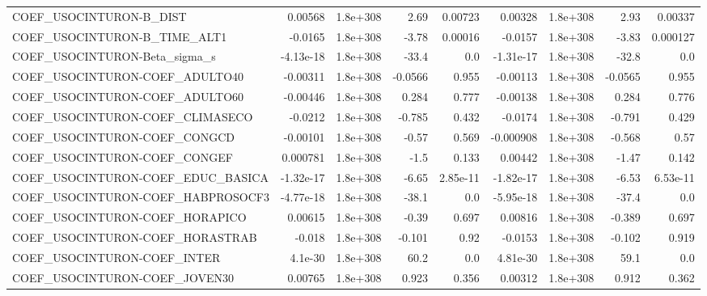 \begin{tabular}{lrrrrrrrr}
COEF\_USOCINTURON-B\_DIST           &     0.00568 &     1.8e+308 &      2.69 &  0.00723 &    0.00328 &    1.8e+308 &         2.93 &       0.00337 \\
COEF\_USOCINTURON-B\_TIME\_ALT1      &     -0.0165 &     1.8e+308 &     -3.78 &  0.00016 &    -0.0157 &    1.8e+308 &        -3.83 &      0.000127 \\
COEF\_USOCINTURON-Beta\_sigma\_s     &   -4.13e-18 &     1.8e+308 &     -33.4 &      0.0 &  -1.31e-17 &    1.8e+308 &        -32.8 &           0.0 \\
COEF\_USOCINTURON-COEF\_ADULTO40    &    -0.00311 &     1.8e+308 &   -0.0566 &    0.955 &   -0.00113 &    1.8e+308 &      -0.0565 &         0.955 \\
COEF\_USOCINTURON-COEF\_ADULTO60    &    -0.00446 &     1.8e+308 &     0.284 &    0.777 &   -0.00138 &    1.8e+308 &        0.284 &         0.776 \\
COEF\_USOCINTURON-COEF\_CLIMASECO   &     -0.0212 &     1.8e+308 &    -0.785 &    0.432 &    -0.0174 &    1.8e+308 &       -0.791 &         0.429 \\
COEF\_USOCINTURON-COEF\_CONGCD      &    -0.00101 &     1.8e+308 &     -0.57 &    0.569 &  -0.000908 &    1.8e+308 &       -0.568 &          0.57 \\
COEF\_USOCINTURON-COEF\_CONGEF      &    0.000781 &     1.8e+308 &      -1.5 &    0.133 &    0.00442 &    1.8e+308 &        -1.47 &         0.142 \\
COEF\_USOCINTURON-COEF\_EDUC\_BASICA &   -1.32e-17 &     1.8e+308 &     -6.65 & 2.85e-11 &  -1.82e-17 &    1.8e+308 &        -6.53 &      6.53e-11 \\
COEF\_USOCINTURON-COEF\_HABPROSOCF3 &   -4.77e-18 &     1.8e+308 &     -38.1 &      0.0 &  -5.95e-18 &    1.8e+308 &        -37.4 &           0.0 \\
COEF\_USOCINTURON-COEF\_HORAPICO    &     0.00615 &     1.8e+308 &     -0.39 &    0.697 &    0.00816 &    1.8e+308 &       -0.389 &         0.697 \\
COEF\_USOCINTURON-COEF\_HORASTRAB   &      -0.018 &     1.8e+308 &    -0.101 &     0.92 &    -0.0153 &    1.8e+308 &       -0.102 &         0.919 \\
COEF\_USOCINTURON-COEF\_INTER       &     4.1e-30 &     1.8e+308 &      60.2 &      0.0 &   4.81e-30 &    1.8e+308 &         59.1 &           0.0 \\
COEF\_USOCINTURON-COEF\_JOVEN30     &     0.00765 &     1.8e+308 &     0.923 &    0.356 &    0.00312 &    1.8e+308 &        0.912 &         0.362 \\

\end{tabular}

